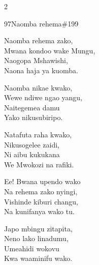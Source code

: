 \documentclass{article}
\begin{document}
\begin{multicols}{2}
\begin{hymn}{97}{Naomba rehema}{\#199}
\begin{stanza}
Naomba rehema zako,\\
Mwana kondoo wake Mungu,\\
Naogopa Mshawishi,\\
Naona haja ya kuomba.
\end{stanza}
\begin{stanza}
Naomba nikae kwako,\\
Wewe ndiwe ngao yangu,\\
Naitegemea damu\\
Yako nikusubiripo.
\end{stanza}
\begin{stanza}
Natafuta raha kwako,\\
Nikusogelee zaidi,\\
Ni aibu kukukana\\
We Mwokozi na rafiki.
\end{stanza}
\begin{stanza}
Ee! Bwana upendo wako\\
Na rehema zako nyingi,\\
Vishinde kiburi changu,\\
Na kunifanya wako tu.
\end{stanza}
\begin{stanza}
Japo mbingu zitapita,\\
Neno lako linadumu,\\
Umeahidi wokovu\\
Kwa waaminifu wako.
\end{stanza}
\end{hymn}


\end{multicols}
\end{document}
